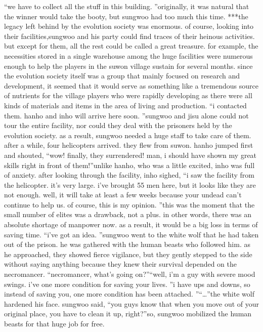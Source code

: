 “we have to collect all the stuff in this building.
”originally, it was natural that the winner would take the booty, but sungwoo had too much this time.
***the legacy left behind by the evolution society was enormous.
 of course, looking into their facilities,sungwoo and his party could find traces of their heinous activities.
 but except for them, all the rest could be called a great treasure.
for example, the necessities stored in a single warehouse among the huge facilities were numerous enough to help the players in the suwon village sustain for several months.
since the evolution society itself was a group that mainly focused on research and development, it seemed that it would serve as something like a tremendous source of nutrients for the village players who were rapidly developing as there were all kinds of materials and items in the area of living and production.
“i contacted them.
 hanho and inho will arrive here soon.
”sungwoo and jisu alone could not tour the entire facility, nor could they deal with the prisoners held by the evolution society.
 as a result, sungwoo needed a huge staff to take care of them.
after a while, four helicopters arrived.
 they flew from suwon.
hanho jumped first and shouted, “wow! finally, they surrendered! man, i should have shown my great skills right in front of them!”unlike hanho, who was a little excited, inho was full of anxiety.
after looking through the facility, inho sighed, “i saw the facility from the helicopter.
 it’s very large.
 i’ve brought 55 men here, but it looks like they are not enough.
 well, it will take at least a few weeks because your undead can’t continue to help us.
 of course, this is my opinion.
”this was the moment that the small number of elites was a drawback, not a plus.
 in other words, there was an absolute shortage of manpower now.
 as a result, it would be a big loss in terms of saving time.
“i’ve got an idea.
”sungwoo went to the white wolf that he had taken out of the prison.
 he was gathered with the human beasts who followed him.
as he approached, they showed fierce vigilance, but they gently stepped to the side without saying anything because they knew their survival depended on the necromancer.
“necromancer, what’s going on?”“well, i’m a guy with severe mood swings.
 i’ve one more condition for saving your lives.
”i have ups and downs, so instead of saving you, one more condition has been attached.
”“…”the white wolf hardened his face.
sungwoo said, “you guys know that when you move out of your original place, you have to clean it up, right?”so, sungwoo mobilized the human beasts for that huge job for free.


 